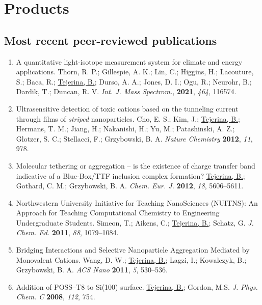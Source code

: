 \documentclass{article}
\begin{document}
\section*{Products}

\subsection*{Most recent peer-reviewed publications}

\begin{enumerate}

\item A quantitative light-isotope measurement system for climate and energy applications. Thorn, R. P.; Gillespie, A. K.; Lin, C.; Higgins, H.; Lacouture, S.; Baca, R.; \underline{Tejerina, B.}; Durso, A. A.; Jones, D. I.; Ogu, R.; Neurohr, B.; Dardik, T.; Duncan, R. V. \emph{Int. J. Mass Spectrom.},  \textbf{2021}, \textit{464}, 116574.

\item Ultrasensitive detection of toxic cations based on the tunneling current through films of \emph{striped} nanoparticles. Cho, E. S.; Kim, J.; \underline{Tejerina, B.}; Hermans, T. M.; Jiang, H.; Nakanishi, H.; Yu, M.; Patashinski, A. Z.; Glotzer, S. C.; Stellacci, F.; Grzybowski, B. A. \emph{Nature Chemistry} {\bf 2012}, \emph{11}, 978.

\item Molecular tethering or aggregation -- is the existence of charge transfer band indicative of a Blue-Box/TTF inclusion complex formation? \underline{Tejerina, B.}; Gothard, C. M.; Grzybowski, B. A. \emph{Chem. Eur. J.} {\bf 2012}, \emph{18}, 5606--5611.

\item Northwestern University Initiative for Teaching NanoSciences (NUITNS): An Approach for Teaching Computational Chemistry to Engineering Undergraduate Students. Simeon, T.; Aikens, C.; \underline{Tejerina, B.}; Schatz, G. \emph{J. Chem. Ed.} {\bf 2011}, \emph{88}, 1079--1084.

\item  Bridging Interactions and Selective Nanoparticle Aggregation Mediated by Monovalent Cations. Wang, D. W.;  \underline{Tejerina, B.}; Lagzi, I.; Kowalczyk, B.; Grzybowski, B. A. \emph{ACS Nano} {\bf 2011}, \emph{5}, 530--536.

 \item Addition of POSS--T8 to Si(100) surface.  \underline{Tejerina, B.}; Gordon, M.S. \emph{J. Phys. Chem. C} {\bf 2008}, \emph{112}, 754.
\end{enumerate}
\end{document}
